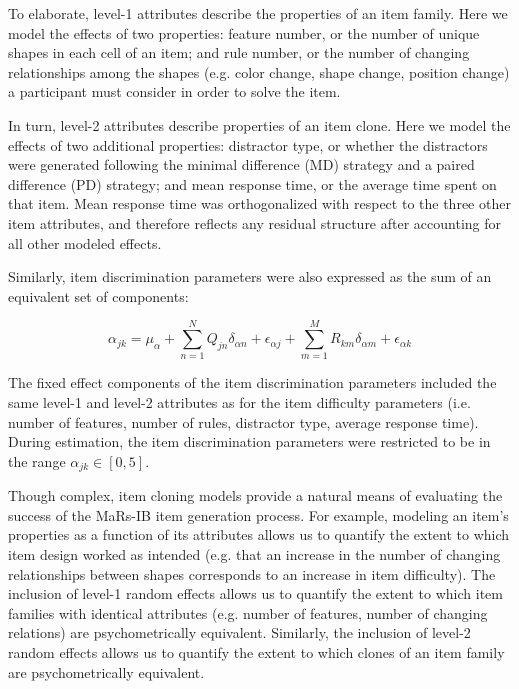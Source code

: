 \documentclass[a4paper,man,natbib]{apa6}
\begin{document}
To elaborate, level-1 attributes describe the properties of an item family. Here we model the effects of two properties: feature number, or the number of unique shapes in each cell of an item; and rule number, or the number of changing relationships among the shapes (e.g. color change, shape change, position change) a participant must consider in order to solve the item. 

In turn, level-2 attributes describe properties of an item clone. Here we model the effects of two additional properties: distractor type, or whether the distractors were generated following the minimal difference (MD) strategy and a paired difference (PD) strategy; and mean response time, or the average time spent on that item. Mean response time was orthogonalized with respect to the three other item attributes, and therefore reflects any residual structure after accounting for all other modeled effects. 

Similarly, item discrimination parameters were also expressed as the sum of an equivalent set of components:

\begin{equation}
\alpha_{jk} = \mu_\alpha + \sum_{n=1}^N Q_{jn} \delta_{\alpha n} + \epsilon_{\alpha j} + \sum_{m=1}^M R_{km} \delta_{\alpha m} + \epsilon_{\alpha k}
\end{equation}

\noindent The fixed effect components of the item discrimination parameters included the same level-1 and level-2 attributes as for the item difficulty parameters (i.e. number of features, number of rules, distractor type, average response time). During estimation, the item discrimination parameters were restricted to be in the range $\alpha_{jk} \in [0, 5]$.

Though complex, item cloning models provide a natural means of evaluating the success of the MaRs-IB item generation process. For example, modeling an item's properties as a function of its attributes allows us to quantify the extent to which item design worked as intended (e.g. that an increase in the number of changing relationships between shapes corresponds to an increase in item difficulty). The inclusion of level-1 random effects allows us to quantify the extent to which item families with identical attributes (e.g. number of features, number of changing relations) are psychometrically equivalent. Similarly, the inclusion of level-2 random effects allows us to quantify the extent to which clones of an item family are psychometrically equivalent. 
\end{document}
